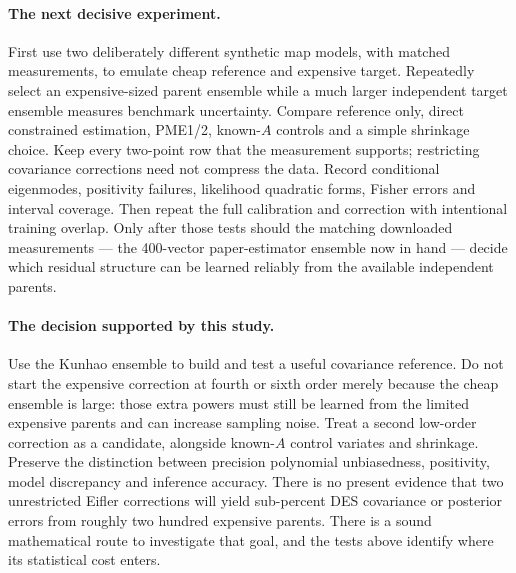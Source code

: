 \documentclass[11pt]{article}
\begin{document}
\paragraph{The next decisive experiment.}
First use two deliberately different synthetic map models, with matched
measurements, to emulate cheap reference and expensive target. Repeatedly
select an expensive-sized parent ensemble while a much larger independent
target ensemble measures benchmark uncertainty. Compare reference only,
direct constrained estimation, PME1/2, known-$A$ controls and a simple
shrinkage choice. Keep every two-point row that the measurement supports;
restricting covariance corrections need not compress the data. Record
conditional eigenmodes, positivity failures, likelihood quadratic forms,
Fisher errors and interval coverage. Then repeat the full calibration and
correction with intentional training overlap. Only after those tests
should the matching downloaded measurements --- the 400-vector
paper-estimator ensemble now in hand --- decide which residual structure
can be learned reliably from the available independent parents.

\paragraph{The decision supported by this study.}
Use the Kunhao ensemble to build and test a useful covariance reference.
Do not start the expensive correction at fourth or sixth order merely
because the cheap ensemble is large: those extra powers must still be
learned from the limited expensive parents and can increase sampling noise.
Treat a second low-order correction as a candidate, alongside known-$A$
control variates and shrinkage. Preserve the distinction between precision
polynomial unbiasedness, positivity, model discrepancy and inference
accuracy. There is no present evidence that two unrestricted Eifler
corrections will yield sub-percent DES covariance or posterior errors from
roughly two hundred expensive parents. There is a sound mathematical route
to investigate that goal, and the tests above identify where its statistical
cost enters.
\end{document}
